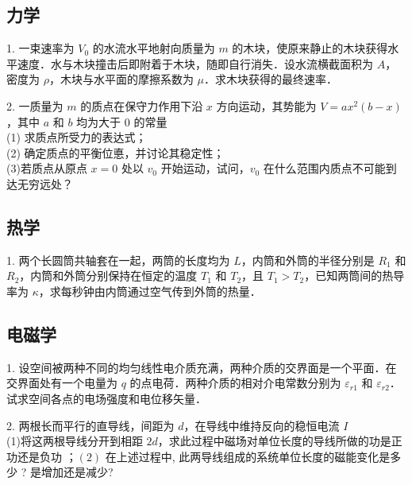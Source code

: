 \subsection{力学}
1. 一束速率为 $V_{0}$ 的水流水平地射向质量为 $m$ 的木块，使原来静止的木块获得水平速度．水与木块撞击后即附着于木块，随即自行消失．设水流横截面积为 $A$，密度为 $\rho$，木块与水平面的摩擦系数为 $\mu$．求木块获得的最终速率．

2. 一质量为 $m$ 的质点在保守力作用下沿 $x$ 方向运动，其势能为 $V=a x^{2}(b-x)$，其中 $a$ 和 $b$ 均为大于 0 的常量\\
(1) 求质点所受力的表达式；\\
(2) 确定质点的平衡位悳，并讨论其稳定性；\\
(3)若质点从原点 $x=0$ 处以 $v_{0}$ 开始运动，试问，$v_{0}$ 在什么范围内质点不可能到达无穷远处？
\subsection{热学}
1. 两个长圆筒共轴套在一起，两筒的长度均为 $L$，内筒和外筒的半径分别是 $R_{1}$ 和 $R_{2}$，内筒和外筒分别保持在恒定的温度 $T_{1}$ 和 $T_{2}$，且 $T_{1}>T_{2}$，已知两筒间的热导率为 $\kappa$，求每秒钟由内筒通过空气传到外筒的热量．
\subsection{电磁学}
1. 设空间被两种不同的均匀线性电介质充满，两种介质的交界面是一个平面．在交界面处有一个电量为 $q$ 的点电荷．两种介质的相对介电常数分别为 $\varepsilon_{r 1}$ 和 $\varepsilon_{r 2}$．试求空间各点的电场强度和电位移矢量．

2. 两根长而平行的直导线，间距为 $d$，在导线中维持反向的稳恒电流 $I$\\
(1)将这两根导线分开到相距 $2 d$，求此过程中磁场对单位长度的导线所做的功是正功还是负功 ；$(2)$ 在上述过程中, 此两导线组成的系统单位长度的磁能变化是多少 ? 是增加还是减少?

